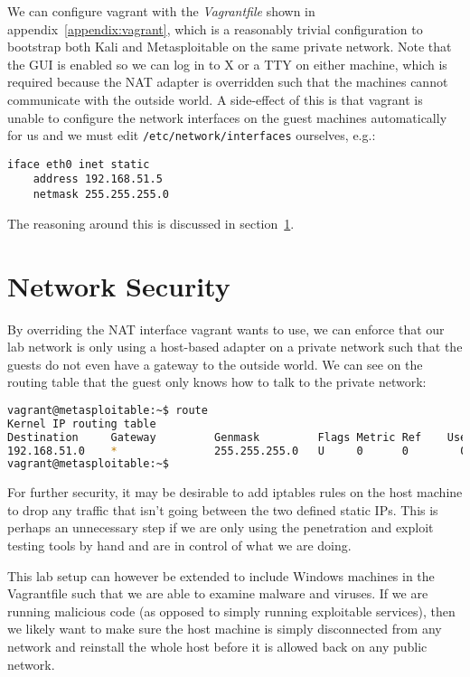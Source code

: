 \documentclass{report}
\begin{document}
We can configure vagrant with the \emph{Vagrantfile} shown in appendix~\ref{appendix:vagrant},
which is a reasonably trivial configuration to bootstrap both Kali and Metasploitable on
the same private network. Note that the GUI is enabled so we can log in to X or a TTY
on either machine, which is required because the NAT adapter is overridden such that the
machines cannot communicate with the outside world. A side-effect of this is that
vagrant is unable to configure the network interfaces on the guest machines automatically
for us and we must edit \texttt{/etc/network/interfaces} ourselves, e.g.:

\begin{lstlisting}
iface eth0 inet static
    address 192.168.51.5
    netmask 255.255.255.0
\end{lstlisting}

The reasoning around this is discussed in section~\ref{sec:netsec}.

\section{Network Security}
\label{sec:netsec}

By overriding the NAT interface vagrant wants to use, we can enforce that
our lab network is only using a host-based adapter on a private network such
that the guests do not even have a gateway to the outside world. We can see
on the routing table that the guest only knows how to talk to the private
network:

\begin{lstlisting}[language=bash]
vagrant@metasploitable:~$ route
Kernel IP routing table
Destination     Gateway         Genmask         Flags Metric Ref    Use Iface
192.168.51.0    *               255.255.255.0   U     0      0        0 eth0
vagrant@metasploitable:~$
\end{lstlisting}

For further security, it may be desirable to add iptables rules on the host
machine to drop any traffic that isn't going between the two defined
static IPs. This is perhaps an unnecessary step if we are only using the
penetration and exploit testing tools by hand and are in control of what
we are doing.

This lab setup can however be extended to include Windows
machines in the Vagrantfile such that we are able to examine malware and
viruses. If we are running malicious code (as opposed to simply running
exploitable services), then we likely want to make sure the host machine
is simply disconnected from any network and reinstall the whole host
before it is allowed back on any public network.
\end{document}
